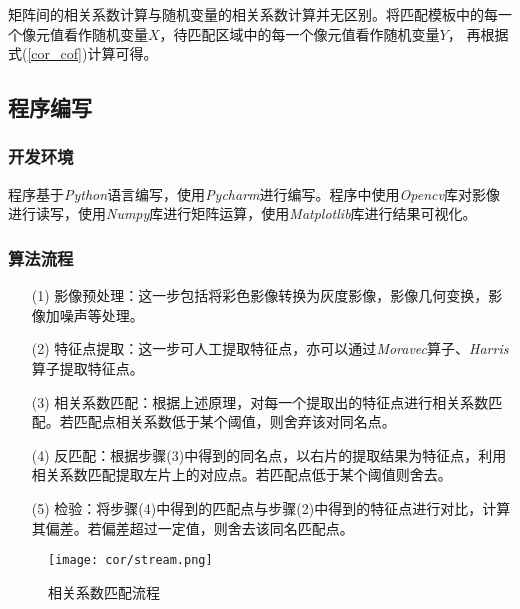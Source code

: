         矩阵间的相关系数计算与随机变量的相关系数计算并无区别。将匹配模板中的每一个像元值看作随机变量$X$，待匹配区域中的每一个像元值看作随机变量$Y$，
        再根据式(\ref{cor_cof})计算可得。

\subsection{程序编写}
    \subsubsection{开发环境}
        程序基于\textit{Python}语言编写，使用\textit{Pycharm}进行编写。程序中使用\textit{Opencv}库对影像进行读写，使用\textit{Numpy}库进行矩阵运算，使用\textit{Matplotlib}库进行结果可视化。
    \subsubsection{算法流程}
        \begin{enumerate}
            \item [(1)]影像预处理：这一步包括将彩色影像转换为灰度影像，影像几何变换，影像加噪声等处理。
            \item [(2)]特征点提取：这一步可人工提取特征点，亦可以通过\textit{Moravec}算子、\textit{Harris}算子提取特征点。
            \item [(3)]相关系数匹配：根据上述原理，对每一个提取出的特征点进行相关系数匹配。若匹配点相关系数低于某个阈值，则舍弃该对同名点。
            \item [(4)]反匹配：根据步骤(3)中得到的同名点，以右片的提取结果为特征点，利用相关系数匹配提取左片上的对应点。若匹配点低于某个阈值则舍去。
            \item [(5)]检验：将步骤(4)中得到的匹配点与步骤(2)中得到的特征点进行对比，计算其偏差。若偏差超过一定值，则舍去该同名匹配点。
        \end{enumerate}

        \begin{figure}[H]
            \centering 
            \texttt{[image: cor/stream.png]}
            \caption{相关系数匹配流程}
            \label{corstream}
        \end{figure}

